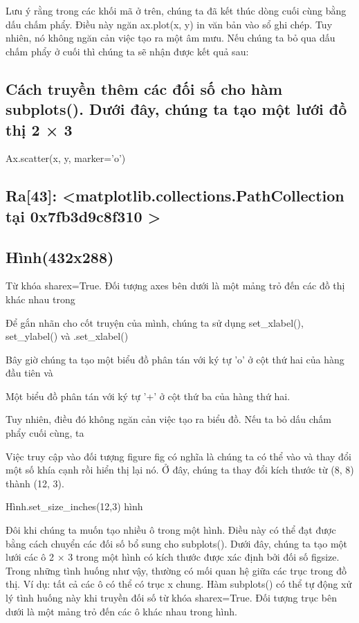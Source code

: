 Lưu ý rằng trong các khối mã ở trên, chúng ta đã kết thúc dòng cuối cùng bằng dấu chấm phẩy. Điều này ngăn ax.plot(x, y) in văn bản vào sổ ghi chép. Tuy nhiên, nó không ngăn cản việc tạo ra một âm mưu. Nếu chúng ta bỏ qua dấu chấm phẩy ở cuối thì chúng ta sẽ nhận được kết quả sau:

\subsection{Cách truyền thêm các đối số cho hàm subplots(). Dưới đây, chúng ta tạo một lưới đồ thị 2 × 3}

Ax.scatter(x, y, marker='o')

\subsection{Ra[43]: <matplotlib.collections.PathCollection tại 0x7fb3d9c8f310 >}

\subsection{Hình(432x288)}

Từ khóa sharex=True. Đối tượng axes bên dưới là một mảng trỏ đến các đồ thị khác nhau trong

Để gắn nhãn cho cốt truyện của mình, chúng ta sử dụng set\_xlabel(), set\_ylabel() và .set\_xlabel()

Bây giờ chúng ta tạo một biểu đồ phân tán với ký tự 'o' ở cột thứ hai của hàng đầu tiên và

Một biểu đồ phân tán với ký tự '+' ở cột thứ ba của hàng thứ hai.

Tuy nhiên, điều đó không ngăn cản việc tạo ra biểu đồ. Nếu ta bỏ dấu chấm phẩy cuối cùng, ta

Việc truy cập vào đối tượng figure fig có nghĩa là chúng ta có thể vào và thay đổi một số khía cạnh rồi hiển thị lại nó. Ở đây, chúng ta thay đổi kích thước từ (8, 8) thành (12, 3).

Hình.set\_size\_inches(12,3) hình

Đôi khi chúng ta muốn tạo nhiều ô trong một hình. Điều này có thể đạt được bằng cách chuyển các đối số bổ sung cho subplots(). Dưới đây, chúng ta tạo một lưới các ô 2 × 3 trong một hình có kích thước được xác định bởi đối số figsize. Trong những tình huống như vậy, thường có mối quan hệ giữa các trục trong đồ thị. Ví dụ: tất cả các ô có thể có trục x chung. Hàm subplots() có thể tự động xử lý tình huống này khi truyền đối số từ khóa sharex=True. Đối tượng trục bên dưới là một mảng trỏ đến các ô khác nhau trong hình.

